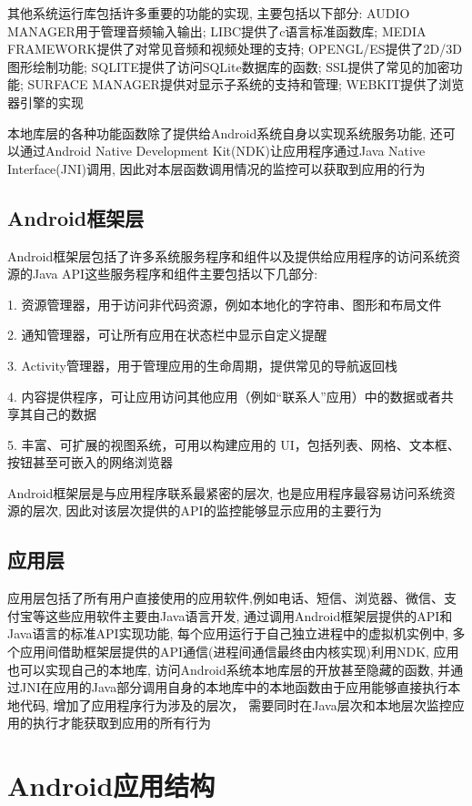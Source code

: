 其他系统运行库包括许多重要的功能的实现, 主要包括以下部分: 
AUDIO MANAGER用于管理音频输入输出; 
LIBC提供了c语言标准函数库; 
MEDIA FRAMEWORK提供了对常见音频和视频处理的支持; 
OPENGL/ES提供了2D/3D图形绘制功能;
SQLITE提供了访问SQLite数据库的函数;
SSL提供了常见的加密功能;
SURFACE MANAGER提供对显示子系统的支持和管理;
WEBKIT提供了浏览器引擎的实现\juhao

本地库层的各种功能函数除了提供给Android系统自身以实现系统服务功能, 还可以通过Android Native Development Kit(NDK)让应用程序通过Java Native Interface(JNI)调用, 因此对本层函数调用情况的监控可以获取到应用的行为\juhao

\subsection*{Android框架层}
Android框架层包括了许多系统服务程序和组件以及提供给应用程序的访问系统资源的Java API\juhao 这些服务程序和组件主要包括以下几部分:

1. 资源管理器，用于访问非代码资源，例如本地化的字符串、图形和布局文件

2. 通知管理器，可让所有应用在状态栏中显示自定义提醒

3. Activity管理器，用于管理应用的生命周期，提供常见的导航返回栈

4. 内容提供程序，可让应用访问其他应用（例如“联系人”应用）中的数据或者共享其自己的数据

5. 丰富、可扩展的视图系统，可用以构建应用的 UI，包括列表、网格、文本框、按钮甚至可嵌入的网络浏览器

Android框架层是与应用程序联系最紧密的层次, 也是应用程序最容易访问系统资源的层次, 因此对该层次提供的API的监控能够显示应用的主要行为\juhao

\subsection*{应用层}
应用层包括了所有用户直接使用的应用软件,例如电话、短信、浏览器、微信、支付宝等\juhao 这些应用软件主要由Java语言开发, 通过调用Android框架层提供的API和Java语言的标准API实现功能, 每个应用运行于自己独立进程中的虚拟机实例中, 多个应用间借助框架层提供的API通信(进程间通信最终由内核实现)\juhao 利用NDK, 应用也可以实现自己的本地库, 访问Android系统本地库层的开放甚至隐藏的函数, 并通过JNI在应用的Java部分调用自身的本地库中的本地函数\juhao 由于应用能够直接执行本地代码, 增加了应用程序行为涉及的层次， 需要同时在Java层次和本地层次监控应用的执行才能获取到应用的所有行为\juhao

\section{Android应用结构}
